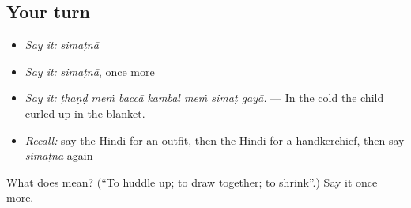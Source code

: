 \subsection*{Your turn}
\begin{itemize}
\raggedright
  \item \emph{Say it:} \emph{simaṭnā}
  \item \emph{Say it:} \emph{simaṭnā}, once more
  \item \emph{Say it:} \emph{ṭhaṇḍ meṁ baccā kambal meṁ simaṭ gayā.} — In the cold the child curled up in the blanket.
  \item \emph{Recall:} say the Hindi for an outfit, then the Hindi for a handkerchief, then say \emph{simaṭnā} again
\end{itemize}

\begin{tcolorbox}[breakable,colback=teal!4,colframe=teal!35!black,title={Before you move on}]
What does  mean? (\textquotedblleft{}To huddle up; to draw together; to shrink\textquotedblright{}.) Say it once more.
\end{tcolorbox}
